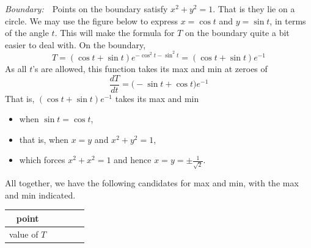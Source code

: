 \begin{eg}
\smallskip
\noindent\emph{Boundary:}\ \ 
Points on the boundary satisfy $x^2+y^2=1$. That is they lie on a circle. 
We may use the figure below to express $x=\cos t$ and $y=\sin t$, in terms
of the angle $t$. This will make the formula for $T$ on the boundary quite a 
bit easier to deal with. On the boundary,
\begin{equation*}
T = (\cos t+\sin t)e^{-\cos^2 t -\sin^2 t}
=(\cos t+\sin t)e^{-1}
\end{equation*}
As all $t$'s are allowed, this function takes its max and min at zeroes of
\begin{equation*}
\frac{dT}{dt}=\big(-\sin t+\cos t\big)e^{-1}
\end{equation*}
That is, $(\cos t+\sin t)e^{-1}$ takes its max and min 
\begin{itemize}
\item
when $\sin t=\cos t$,
\item
that is, when $x=y$ and $x^2+y^2=1$, 
\item
which forces $x^2+x^2=1$ and hence $x=y=\pm\tfrac{1}{\sqrt{2}}$. 
\end{itemize}
All together, we have the following candidates for max and min, with the
max and min indicated.
\begin{center}
\renewcommand{\arraystretch}{1.3}
     \begin{tabular}{|c|c|c|c|c|}
     \hline
       point
       &\raisebox{2pt}{$(\half,\half)$}
       &\raisebox{2pt}{$(-\half,-\half)$}
       &\raisebox{2pt}{$(\tfrac{1}{\sqrt{2}},\tfrac{1}{\sqrt{2}})$} 
       &\raisebox{2pt}{$(-\tfrac{1}{\sqrt{2}},-\tfrac{1}{\sqrt{2}})$} \\ \hline
       value of $T$
       &\raisebox{2pt}{$\tfrac{1}{\sqrt{e}}\approx0.61$}

\end{tabular}
\end{center}
\end{eg}
